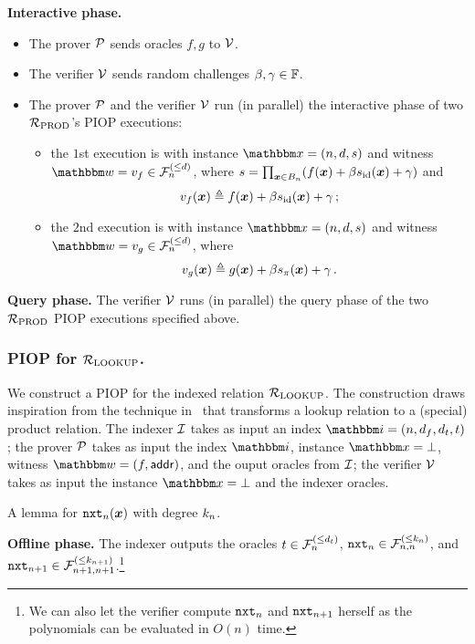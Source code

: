 \textbf{Interactive phase.} 
\begin{itemize}
    \item The prover $\mathcal{P}$ sends oracles $f, g$ to $\mathcal{V}$.
    \item The verifier $\mathcal{V}$ sends random challenges $\beta, \gamma \in \mathbb{F}$.
    \item The prover $\mathcal{P}$ and the verifier $\mathcal{V}$ run (in parallel) the interactive phase 
    of two ${\mathcal{R}}_{\text{PROD}}$'s PIOP executions:
        \begin{itemize}
            \item the $1$st execution is with instance $\instR = (n, d, s)$ and
                witness $\witR = v_{f} \in \bdp{n}{d}$, where 
                $
                    s = \prod_{\boldsymbol{x}\in B_{n}} (f(\boldsymbol{x}) + \beta s_{\text{id}}(\boldsymbol{x}) + \gamma)
                $ and
                \[
                    v_{f}(\boldsymbol{x}) \mathrel{\triangleq} f(\boldsymbol{x}) + \beta s_{\text{id}}(\boldsymbol{x}) + \gamma \,;
                \]
            \item the $2$nd execution is with instance $\instR = (n, d, s)$ and 
                witness $\witR = v_{g} \in \bdp{n}{d}$, where 
                \[
                    v_{g}(\boldsymbol{x}) \mathrel{\triangleq} g(\boldsymbol{x}) + \beta s_{\pi}(\boldsymbol{x}) + \gamma \,.
                \]
        \end{itemize}
\end{itemize}

\textbf{Query phase.}
The verifier $\mathcal{V}$ runs (in parallel) the query phase of the two ${\mathcal{R}}_{\text{PROD}}$ PIOP 
executions specified above.

\subsubsection*{PIOP for ${\mathcal{R}}_{\text{LOOKUP}}$.} 
We construct a PIOP for the indexed relation ${\mathcal{R}}_{\text{LOOKUP}}$.
The construction draws inspiration from the technique in~\cite{GW20} that 
transforms a lookup relation to a (special) product relation.
The indexer $\mathcal{I}$ takes as input an index $\idxR = (n, d_f, d_t, t)$;
the prover $\mathcal{P}$ takes as input the index $\idxR$, instance $\instR = \bot$,
witness $\witR = (f, \addr)$, and the ouput oracles from $\mathcal{I}$;
the verifier $\mathcal{V}$ takes as input the instance $\instR = \bot$ and 
the indexer oracles.

\begin{lemma}
    A lemma for $\mathtt{nxt}_{n}(\boldsymbol{x})$ with degree $k_{n}$.
\end{lemma}

\textbf{Offline phase.}
The indexer outputs the oracles $t \in {\mathcal{F}}_{n}^{(\le{d_t})}$, $\mathtt{nxt}_{n} \in {\mathcal{F}}_{n,n}^{(\le{k_{n}})}$,
and $\mathtt{nxt}_{n+1} \in {\mathcal{F}}_{n+1,n+1}^{(\le{k_{n+1}})}$.\footnote{We can also let the verifier 
compute $\mathtt{nxt}_{n}$ and $\mathtt{nxt}_{n+1}$ herself as the polynomials can be evaluated in $O(n)$ time.}

